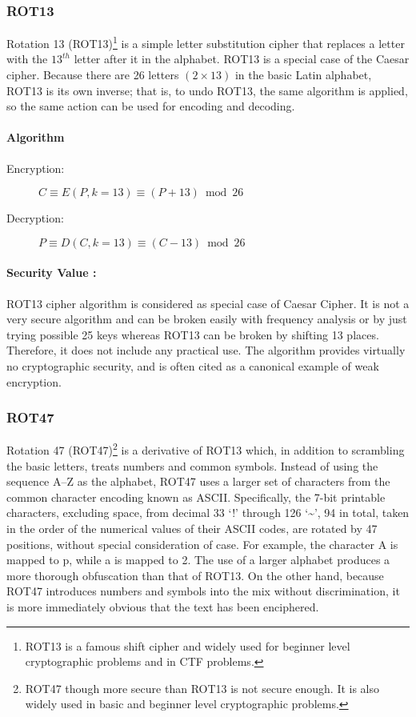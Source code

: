 \documentclass[british]{article}
\begin{document}
\subsubsection{ROT13}

Rotation 13 (ROT13)\footnote{ROT13 is a famous shift cipher and widely used for beginner level
	cryptographic problems and in CTF problems.} is a simple letter substitution cipher that replaces a letter with
the $13^{th}$ letter after it in the alphabet. ROT13 is a special
case of the Caesar cipher. Because there are 26 letters $(2\times13)$
in the basic Latin alphabet, ROT13 is its own inverse; that is, to
undo ROT13, the same algorithm is applied, so the same action can
be used for encoding and decoding.

\paragraph{Algorithm}
\begin{description}
	\item [{Encryption:}] $C\equiv E(P,k=13)\equiv(P+13)\bmod26$
	\item [{Decryption:}] $P\equiv D(C,k=13)\equiv(C-13)\bmod26$
\end{description}

\paragraph{Security Value : }

ROT13 cipher algorithm is considered as special case of Caesar Cipher.
It is not a very secure algorithm and can be broken easily with frequency
analysis or by just trying possible 25 keys whereas ROT13 can be broken
by shifting 13 places. Therefore, it does not include any practical
use. The algorithm provides virtually no cryptographic security, and
is often cited as a canonical example of weak encryption.

\subsubsection{ROT47}

Rotation 47 (ROT47)\footnote{ROT47 though more secure than ROT13 is not secure enough. It is also
	widely used in basic and beginner level cryptographic problems.} is a derivative of ROT13 which, in addition to scrambling the basic
letters, treats numbers and common symbols. Instead of using the sequence
A--Z as the alphabet, ROT47 uses a larger set of characters from
the common character encoding known as ASCII. Specifically, the 7-bit
printable characters, excluding space, from decimal 33 `!' through
126 `\textasciitilde ', 94 in total, taken in the order of the
numerical values of their ASCII codes, are rotated by 47 positions,
without special consideration of case. For example, the character
A is mapped to p, while a is mapped to 2. The use of a larger alphabet
produces a more thorough obfuscation than that of ROT13. On the other
hand, because ROT47 introduces numbers and symbols into the mix without
discrimination, it is more immediately obvious that the text has been
enciphered.
\end{document}
